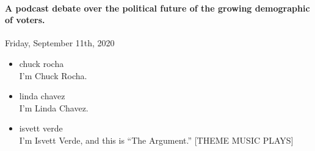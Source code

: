 \hypertarget{a-podcast-debate-over-the-political-future-of-the-growing-demographic-of-voters-2}{%
\paragraph{A podcast debate over the political future of the growing
demographic of
voters.}\label{a-podcast-debate-over-the-political-future-of-the-growing-demographic-of-voters-2}}

Friday, September 11th, 2020

\begin{itemize}
\item
  chuck rocha\\
  I'm Chuck Rocha.
\item
  linda chavez\\
  I'm Linda Chavez.
\item
  isvett verde\\
  I'm Isvett Verde, and this is ``The Argument.'' {[}THEME MUSIC
  PLAYS{]}


\end{itemize}
